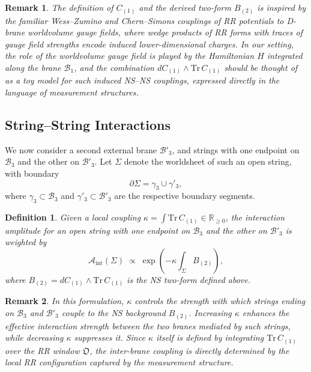 \documentclass{article}
\newtheorem{dn}{Definition}
\newtheorem{rk}{Remark}
\numberwithin{tm}{section}
\numberwithin{dn}{section}
\numberwithin{as}{section}
\numberwithin{rk}{section}
\numberwithin{lem}{section}
\numberwithin{ax}{section}
\numberwithin{pp}{section}
\numberwithin{eg}{section}
\numberwithin{war}{section}
\numberwithin{equation}{section}
\numberwithin{prop}{section}
\numberwithin{nt}{section}
\numberwithin{rc}{section}
\numberwithin{setup}{section}
\begin{document}
\begin{rk}
	The definition of $C_{(1)}$ and the derived two-form $B_{(2)}$ is inspired by the familiar Wess--Zumino and Chern--Simons couplings \cite{Alekseev} of RR potentials to D-brane worldvolume gauge fields, where wedge products of RR forms with traces of gauge field strengths encode induced lower-dimensional charges. In our setting, the role of the worldvolume gauge field is played by the Hamiltonian $H$ integrated along the brane $\mathcal{B}_1$, and the combination $dC_{(1)} \wedge \mathrm{Tr}\,C_{(1)}$ should be thought of as a toy model for such induced NS--NS couplings, expressed directly in the language of measurement structures.
\end{rk}

\subsection{String--String Interactions} \label{SS}
We now consider a second external brane $\mathcal{B}'_3$, and strings with one endpoint on $\mathcal{B}_3$ and the other on $\mathcal{B}'_3$. Let $\Sigma$ denote the worldsheet of such an open string, with boundary
\[
\partial \Sigma = \gamma_3 \cup \gamma'_3,
\]
where $\gamma_3 \subset \mathcal{B}_3$ and $\gamma'_3 \subset \mathcal{B}'_3$ are the respective boundary segments.

\begin{dn}
	Given a local coupling $\kappa = \displaystyle\int \mathrm{Tr}\, C_{(1)} \in \mathbb{R}_{\ge 0}$, the \emph{interaction amplitude} for an open string with one endpoint on $\mathcal{B}_3$ and the other on $\mathcal{B}'_3$ is weighted by
	\[
	\mathcal{A}_{\mathrm{int}}(\Sigma) \;\propto\; \exp\!\left( - \kappa \int_{\Sigma} B_{(2)} \right),
	\]
	where $B_{(2)} = d C_{(1)} \wedge \mathrm{Tr}\, C_{(1)}$ is the NS two-form defined above.
\end{dn}

\begin{rk}
	In this formulation, $\kappa$ controls the strength with which strings ending on $\mathcal{B}_3$ and $\mathcal{B}'_3$ couple to the NS background $B_{(2)}$. Increasing $\kappa$ enhances the effective interaction strength between the two branes mediated by such strings, while decreasing $\kappa$ suppresses it. Since $\kappa$ itself is defined by integrating $\mathrm{Tr}\,C_{(1)}$ over the RR window $\mathfrak{O}$, the inter-brane coupling is directly determined by the local RR configuration captured by the measurement structure.
\end{rk}
\end{document}
